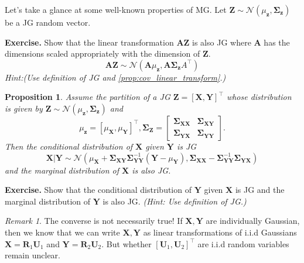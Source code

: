 \documentclass{article}
\newtheorem{proposition}{Proposition}
\DeclareMathOperator*{\1}{\mathbbm{1}}
\renewcommand{\b}[1]{\mathbf{#1}}
\newcommand{\cN}{\mathcal{N}}
\theoremstyle{definition}
\theoremstyle{remark}
\newtheorem{remark}{Remark}
\newcommand{\bSig}{\mathbf{\Sigma}}
\begin{document}
  Let's take a glance at some well-known properties of MG. Let $\b Z\sim \cN(\mu_{\b z}, \bSig_{\b z})$ be a JG random vector.

  \textbf{Exercise.} Show that the linear transformation $\b A\b Z$ is also JG where $\b A$ has the dimensions scaled appropriately with the dimension of $\b Z$.
  \[\b A\b Z\sim \cN(\b A\mu_{\b z}, \b A\b \bSig_{\b z} A^\top)\]
  \textit{Hint:(Use definition of JG and \cref{prop:cov_linear_transform}.)}
  
  \begin{proposition}
    Assume the partition of a JG $\b Z=[\b X, \b Y]^\top$ whose distribution is given by $\b Z\sim \cN(\mu_{\b z}, \bSig_{\b z})$ and 
    \begin{equation*}
      \mu_{\b z}=[\mu_{\b X},\mu_{\b Y}]^\top, \bSig_{\b Z}=\begin{bmatrix}
      \bSig_{\b X\b X} & \bSig_{\b X\b Y}\\
      \bSig_{\b Y\b X} & \bSig_{\b Y\b Y}
      \end{bmatrix}
      .
    \end{equation*}
    Then the conditional distribution of $\b X$ given $\b Y$ is JG 
    \[\b X|\b Y\sim \cN(\mu_{\b X}+\bSig_{\b X\b Y}\bSig_{\b Y\b Y}^{-1}(\b Y-\mu_{\b Y}), \bSig_{\b X\b X}-\bSig_{\b Y\b Y}^{-1}\bSig_{\b Y\b X})\] 
    and the marginal distribution of $\b X$ is also JG.
  \end{proposition}
  \textbf{Exercise.} Show that the conditional distribution of $\b Y$ given $\b X$ is JG and the marginal distribution of $\b Y$ is also JG. \textit{(Hint: Use definition of JG.)}
  \begin{remark}
    The converse is not necessarily true! If $\b X,\b Y$ are individually Gaussian, then we know that we can write $\b X,\b Y$ as linear transformations of i.i.d Gaussians $\b X=\b R_1 \b U_1$ and $\b Y = \b R_2 \b U_2$. But whether $[\b U_1,\b U_2]^\top$ are i.i.d random variables remain unclear. 
  \end{remark}
\end{document}
